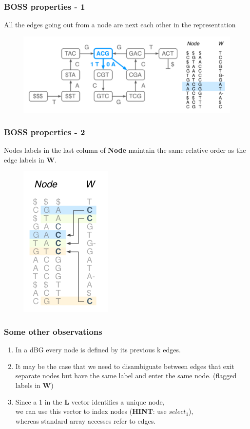 \begin{frame}
\frametitle{BOSS properties - 1}
\begin{claim}[1]
	All the edges going out from a node are next each other in the representation
\end{claim}
\begin{figure}
	\includegraphics[scale=0.25]{img/claim1.png}
\end{figure}
\end{frame}

\begin{frame}
\frametitle{BOSS properties - 2}
\begin{claim}[2]
	Nodes labels in the last column of \textbf{Node} maintain the same relative order as the edge labels in \textbf{W}.
\end{claim}
\begin{figure}
\includegraphics[scale=0.45]{img/claim2.png}
\end{figure}
\end{frame}

\begin{frame}
\frametitle{Some other observations}
\begin{enumerate}
	\item In a dBG every node is defined by its previous k edges.
	\item It may be the case that we need to disambiguate between edges that exit separate nodes but have the same label and enter the same node. (flagged labels in \textbf{W})
	\item Since a 1 in the \textbf{L} vector identifies a unique node,\\ 
	we can use this vector to index nodes (\textbf{HINT}: use $select_1$),\\
	whereas standard array accesses refer to edges.
\end{enumerate}
\end{frame}

